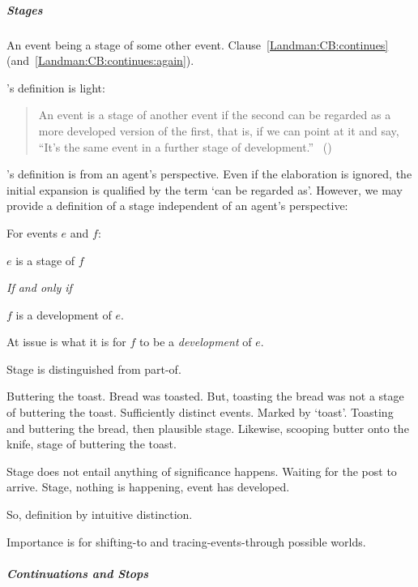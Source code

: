 \subparagraph{Stages}

\begin{note}
  An event being a stage of some other event.
  Clause~\ref{Landman:CB:continues} (and~\ref{Landman:CB:continues:again}).

  \citeauthor{Landman:1992wh}'s definition is light:
  \begin{quote}
    An event is a stage of another event if the second can be regarded as a more developed version of the first, that is, if we can point at it and say, ``It's the same event in a further stage of development.''\newline
    \mbox{ }\hfill\mbox{(\citeyear[23]{Landman:1992wh})}
  \end{quote}
  \citeauthor{Landman:1992wh}'s definition is from an agent's perspective.
  Even if the elaboration is ignored, the initial expansion is qualified by the term `can be regarded as'.
  However, we may provide a definition of a stage independent of an agent's perspective:
  \begin{definition}[Stage]
    For events \(e\) and \(f\):

    \begin{itemize*}
    \item
      \(e\) is a stage of \(f\)
    \item
      \emph{If and only if}
    \item
      \(f\) is a development of \(e\).
    \end{itemize*}
  \end{definition}
  At issue is what it is for \(f\) to be a \emph{development} of \(e\).

  Stage is distinguished from part-of.
  \nocite{Davidson:1967aa}

  Buttering the toast.
  Bread was toasted.
  But, toasting the bread was not a stage of buttering the toast.
  Sufficiently distinct events.
  Marked by `toast'.
  Toasting and buttering the bread, then plausible stage.
  Likewise, scooping butter onto the knife, stage of buttering the toast.

  Stage does not entail anything of significance happens.
  Waiting for the post to arrive.
  Stage, nothing is happening, event has developed.

  So, definition by intuitive distinction.

  Importance is for shifting-to and tracing-events-through possible worlds.
\end{note}

\subparagraph{Continuations and Stops}

